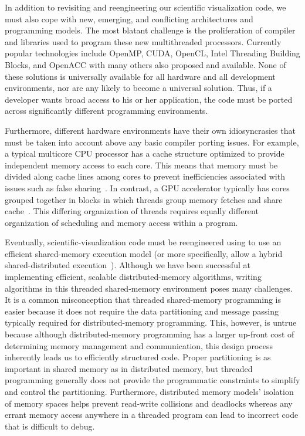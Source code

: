 \documentclass[conference]{IEEEtran}
\newcommand*{\lcite}[1]{~\cite{#1}}
\begin{document}
In addition to revisiting and reengineering our scientific visualization
code, we must also cope with new, emerging, and conflicting architectures
and programming models.  The most blatant challenge is the proliferation of
compiler and libraries used to program these new multithreaded processors.
Currently popular technologies include OpenMP, CUDA, OpenCL, Intel
Threading Building Blocks, and OpenACC with many others also proposed and
available.  None of these solutions is universally available for all
hardware and all development environments, nor are any likely to become a
universal solution.  Thus, if a developer wants broad access to his or her
application, the code must be ported across significantly different
programming environments.

Furthermore, different hardware environments have their own idiosyncrasies
that must be taken into account above any basic compiler porting issues.
For example, a typical multicore CPU processor has a cache structure
optimized to provide independent memory access to each core.  This means
that memory must be divided along cache lines among cores to prevent
inefficiencies associated with issues such as false sharing\lcite{TBB}.  In
contrast, a GPU accelerator typically has cores grouped together in blocks
in which threads group memory fetches and share cache\lcite{Sanders2011}.
This differing organization of threads requires equally different
organization of scheduling and memory access within a program.

Eventually, scientific-visualization code must be reengineered using to use
an efficient shared-memory execution model (or more specifically, allow a
hybrid shared-distributed execution\lcite{Li2008}).  Although we have been
successful at implementing efficient, scalable distributed-memory
algorithms, writing algorithms in this threaded shared-memory environment
poses many challenges.  It is a common misconception that threaded
shared-memory programming is easier because it does not require the data
partitioning and message passing typically required for distributed-memory
programming.  This, however, is untrue because although distributed-memory
programming has a larger up-front cost of determining memory management and
communication, this design process inherently leads us to efficiently
structured code.  Proper partitioning is as important in shared memory as
in distributed memory, but threaded programming generally does not provide
the programmatic constraints to simplify and control the partitioning.
Furthermore, distributed memory models' isolation of memory spaces helps
prevent read-write collisions and deadlocks whereas any errant memory
access anywhere in a threaded program can lead to incorrect code that is
difficult to debug.
\end{document}
